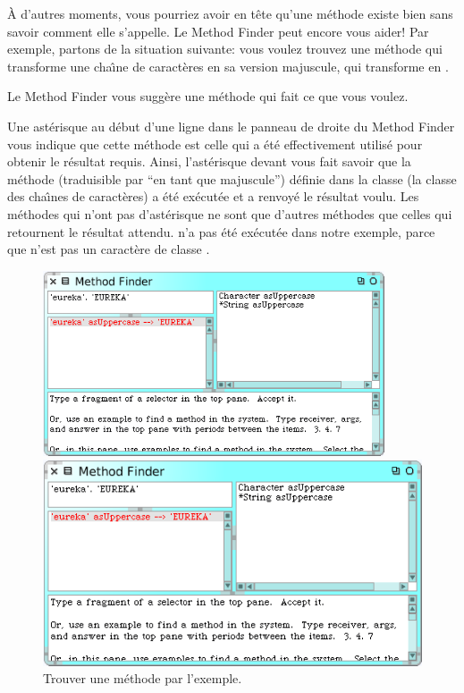 \documentclass[a4paper,10pt,twoside]{book}
\begin{document}
\`A d'autres moments, vous pourriez avoir en t\^ete qu'une m\'ethode
existe bien sans savoir comment elle s'appelle.
Le Method Finder peut encore vous aider! Par exemple, partons de la
situation suivante: vous voulez trouvez une m\'ethode qui transforme
une cha\^{\i}ne de caract\`eres en sa version majuscule, \cad qui
transforme  en .

\noindent
Le Method Finder vous sugg\`ere une m\'ethode qui fait ce
que vous voulez.

Une ast\'erisque au d\'ebut d'une ligne dans le panneau de droite du
Method Finder vous indique que cette m\'ethode est celle qui a \'et\'e
effectivement utilis\'e pour obtenir le r\'esultat requis.
Ainsi, l'ast\'erisque devant  vous fait savoir
que la m\'ethode  
(traduisible par ``en tant que majuscule'')
d\'efinie dans la classe  
(la classe des cha\^{\i}nes de caract\`eres)
a \'et\'e ex\'ecut\'ee et a renvoy\'e le r\'esultat voulu.
Les m\'ethodes qui n'ont pas d'ast\'erisque ne sont que d'autres
m\'ethodes que celles qui retournent le r\'esultat attendu.
 n'a pas \'et\'e ex\'ecut\'ee dans notre
exemple, parce que  n'est pas un caract\`ere de classe .

\begin{figure}[hbt]
\ifluluelse
	{\centerline {\includegraphics[width=0.9\textwidth]{MethodFinder-example1}}}
	{\centerline {\includegraphics[scale=0.7]{MethodFinder-example1}}}
\caption{Trouver une méthode par l'exemple.
\label{fig:methodFinder-example1}}
\end{figure}
\end{document}
